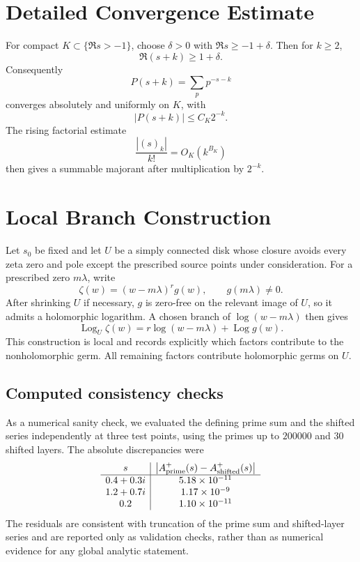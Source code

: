 \documentclass[11pt]{article}
\theoremstyle{definition}
\newcommand{\Logz}{\operatorname{Log}}
\begin{document}
\appendix

\section{Detailed Convergence Estimate}

For compact $K\subset\{\Re s>-1\}$, choose $\delta>0$ with
$\Re s\ge-1+\delta$. Then for $k\ge2$,
\[
\Re(s+k)\ge1+\delta.
\]
Consequently
\[
P(s+k)
=
\sum_p p^{-s-k}
\]
converges absolutely and uniformly on $K$, with
\[
|P(s+k)|\le C_K2^{-k}.
\]
The rising factorial estimate
\[
\frac{|(s)_k|}{k!}=O_K(k^{B_K})
\]
then gives a summable majorant after multiplication by $2^{-k}$.

\section{Local Branch Construction}

Let $s_0$ be fixed and let $U$ be a simply connected disk whose closure avoids every zeta zero and pole except the prescribed source points under consideration. For a prescribed zero $m\lambda$, write
\[
\zeta(w)=(w-m\lambda)^r g(w),
\qquad g(m\lambda)\ne0.
\]
After shrinking $U$ if necessary, $g$ is zero-free on the relevant image of $U$, so it admits a holomorphic logarithm. A chosen branch of $\log(w-m\lambda)$ then gives
\[
\Logz_U\zeta(w)
=
r\log(w-m\lambda)+\Logz g(w).
\]
This construction is local and records explicitly which factors contribute to the nonholomorphic germ. All remaining factors contribute holomorphic germs on $U$.

\subsection{Computed consistency checks}

As a numerical sanity check, we evaluated the defining prime sum and the shifted
series independently at three test points, using the primes up to $200000$ and
$30$ shifted layers. The absolute discrepancies were
\[
\begin{array}{c|c}
s & \left|A^+_{\rm prime}(s)-A^+_{\rm shifted}(s)\right|\\
\hline
0.4+0.3i & 5.18\times10^{-11}\\
1.2+0.7i & 1.17\times10^{-9}\\
0.2 & 1.10\times10^{-11}
\end{array}
\]
The residuals are consistent with truncation of the prime sum and shifted-layer
series and are reported only as validation checks, rather than as numerical evidence for
any global analytic statement.
\end{document}
